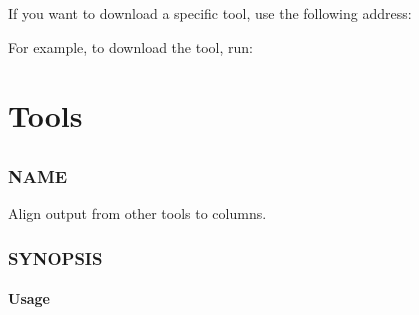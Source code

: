\documentclass[letterpaper,10pt,english]{sphinxmanual}
\begin{document}
\sphinxAtStartPar
If you want to download a specific tool, use the following address:

\sphinxAtStartPar
For example, to download the  tool, run:

\begin{sphinxVerbatim}[commandchars=\\\{\}]
 
\end{sphinxVerbatim}


\part{Tools}
\label{\detokenize{index:tools}}

\chapter{}
\label{\detokenize{mariadb-align-output:mariadb-align-output}}\label{\detokenize{mariadb-align-output::doc}}

\section{NAME}
\label{\detokenize{mariadb-align-output:name}}
\sphinxAtStartPar
{} \sphinxhyphen{} Align output from other tools to columns.


\section{SYNOPSIS}
\label{\detokenize{mariadb-align-output:synopsis}}

\subsection{Usage}
\label{\detokenize{mariadb-align-output:usage}}
\begin{sphinxVerbatim}[commandchars=\\\{\}]
 \PYG{p}{[}\PYG{p}{]}
\end{sphinxVerbatim}
\end{document}
